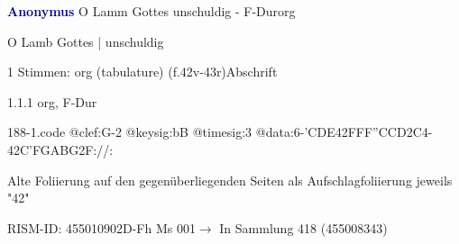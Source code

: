 \documentclass[twocolumn]{book}
\begin{document}
\par \vspace{7pt} \textcolor{darkblue}{\textbf{Anonymus  }}\hfillplus{\textbf{[188]}}\newline O Lamm Gottes unschuldig - F-Dur\newline org
\par \begin{itshape}[f.42v, at left:] O Lamb Gottes | unschuldig\end{itshape} 
\par \textcolor{darkblue}{}  1 Stimmen: org (tabulature)  (f.42v-43r)\newline Abschrift
\par 1.1.1  org, F-Dur  
\begin{filecontents*}{188-1.code}
@clef:G-2
@keysig:bB
@timesig:3
@data:6-{'CDE}42FFF''CCD2C4-42C'FGABG2F://:
\end{filecontents*}
\newline
%
\par Alte Foliierung auf den gegenüberliegenden Seiten als Aufschlagfoliierung jeweils "42"
\par RISM-ID: 455010902\newline D-Fh  Ms 001\newline $\rightarrow$ In Sammlung 418 (455008343)
      
\end{document}
